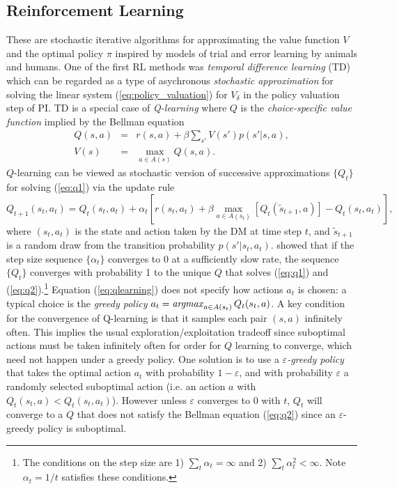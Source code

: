 \subsection{Reinforcement Learning}

These are stochastic iterative algorithms for approximating the value function $V$ and the optimal
policy $\pi$ inspired by models of trial and error learning by animals and humans. One of the first RL methods was 
{\it temporal difference learning\/} (TD) \citet{sutton:1988} which can be regarded as a type of asychronous 
{\it stochastic approximation\/} \citep{robbinsmunro:1951} for solving the linear system (\ref{eq:policy_valuation}) for
$V_\delta$ in the policy valuation step of PI. TD is a special case of  
{\it Q-learning\/} \citep{Watkins:1989} where $Q$ is the {\it choice-specific value function\/} implied by the  Bellman equation
\begin{eqnarray}
      Q(s,a) &=& r(s,a) + \beta \sum_{s'} V(s')p(s'|s,a), \label{eq:q1}   \\
      V(s) &=& \max_{a \in A(s)} Q(s,a).
\label{eq:q2}
\end{eqnarray}
$Q$-learning can be viewed as stochastic version of successive approximations 
$\{Q_t\}$ for solving (\ref{eq:q1}) via the update rule
\begin{equation}
   Q_{t+1}(s_t,a_t)= Q_t(s_t,a_t) + \alpha_t \left[ r(s_t,a_t)+\beta \max_{a \in A(s_t)}[Q_t(\tilde s_{t+1},a)] - Q_t(s_t,a_t) \right],
\label{eq:qlearning}
\end{equation}
where $(s_t,a_t)$ is the state and action taken by the DM at time step $t$, and $\tilde s_{t+1}$ is a random draw from the transition probability
$p(s'|s_t,a_t)$. \citet{Tsitsiklis:1994}
showed that if the step size sequence $\{\alpha_t\}$ converges to 0 at a sufficiently slow rate, the sequence $\{Q_t\}$ converges with probability 1 
to the unique $Q$ that solves (\ref{eq:q1}) and (\ref{eq:q2}).\footnote{\footnotesize 
The conditions on the step size are 1) $\sum_t \alpha_t = \infty$
and 2) $\sum_t \alpha_t^2 < \infty$. Note $\alpha_t=1/t$ satisfies these conditions.}
Equation (\ref{eq:qlearning}) does not specify how actions $a_t$ is chosen: a typical choice is the {\it greedy policy\/}
$a_t = \mathop{\it argmax}_{a \in A(s_t)} Q_t(s_t,a)$. A key condition for the convergence of Q-learning is 
that it samples each pair $(s,a)$ infinitely often.
This implies the usual exploration/exploitation tradeoff since suboptimal actions must
be taken infinitely often for order for $Q$ learning to converge, which need not happen under a greedy policy.
One solution is to use a {\it $\varepsilon$-greedy policy\/} that takes the optimal action $a_t$
 with probability $1-\varepsilon$, and with probability $\varepsilon$ a randomly selected 
suboptimal action (i.e. an action $a$ with $Q_t(s_t,a)<Q_t(s_t,a_t)$). However unless $\varepsilon$ converges
to $0$ with $t$, $Q_t$ will converge to a $Q$ that does not satisfy the Bellman equation (\ref{eq:q2})
since an $\varepsilon$-greedy policy is suboptimal.

